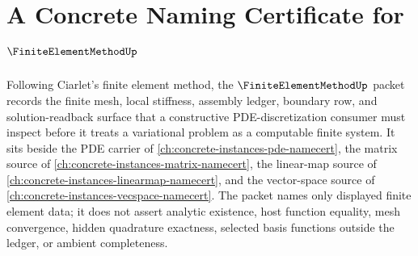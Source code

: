 \chapter{A Concrete Naming Certificate for $\FiniteElementMethodUp$}
\label{ch:concrete-instances-finite-element-method-namecert}

Following Ciarlet's finite element method, the $\FiniteElementMethodUp$ packet records the finite mesh, local stiffness, assembly ledger, boundary row, and solution-readback surface that a constructive PDE-discretization consumer must inspect before it treats a variational problem as a computable finite system. It sits beside the PDE carrier of \autoref{ch:concrete-instances-pde-namecert}, the matrix source of \autoref{ch:concrete-instances-matrix-namecert}, the linear-map source of \autoref{ch:concrete-instances-linearmap-namecert}, and the vector-space source of \autoref{ch:concrete-instances-vecspace-namecert}. The packet names only displayed finite element data; it does not assert analytic existence, host function equality, mesh convergence, hidden quadrature exactness, selected basis functions outside the ledger, or ambient completeness.

